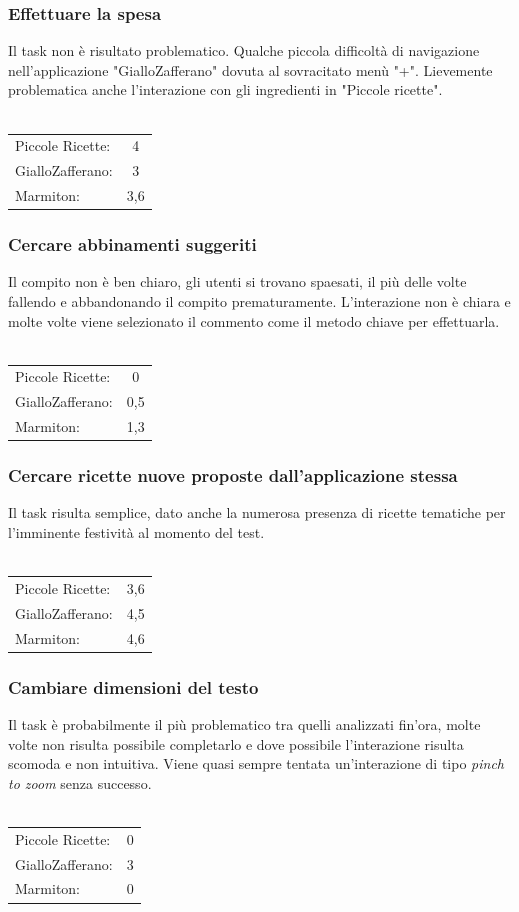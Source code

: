 \subsubsection{Effettuare la spesa}
Il task non è risultato problematico.  Qualche piccola difficoltà di navigazione
nell'applicazione "GialloZafferano" dovuta al sovracitato menù "+".
Lievemente problematica anche l'interazione con gli ingredienti in "Piccole
ricette".\\\\
\begin{tabular}{l c}
Piccole Ricette: & 4\\
GialloZafferano: & 3\\
Marmiton: & 3,6\\
\end{tabular}

\subsubsection{Cercare abbinamenti suggeriti}
Il compito non è ben chiaro, gli utenti si trovano spaesati, il più delle volte
fallendo e abbandonando il compito prematuramente.  L'interazione non è chiara e
molte volte viene selezionato il commento come il metodo chiave per
effettuarla.\\\\
\begin{tabular}{l c}
Piccole Ricette: & 0\\
GialloZafferano: & 0,5\\
Marmiton: & 1,3\\
\end{tabular}

\subsubsection{Cercare ricette nuove proposte dall'applicazione stessa}
Il task risulta semplice, dato anche la numerosa presenza di ricette tematiche
per l'imminente festività al momento del test.\\\\
\begin{tabular}{l c}
Piccole Ricette: & 3,6\\
GialloZafferano: & 4,5\\
Marmiton: & 4,6\\
\end{tabular}

\subsubsection{Cambiare dimensioni del testo}
Il task è probabilmente il più problematico tra quelli analizzati fin'ora, molte
volte non risulta possibile completarlo e dove possibile l'interazione risulta
scomoda e non intuitiva.  Viene quasi sempre tentata
un'interazione di tipo \emph{pinch to zoom} senza successo.\\\\
\begin{tabular}{l c}
Piccole Ricette: & 0\\
GialloZafferano: & 3\\
Marmiton: & 0\\
\end{tabular}
